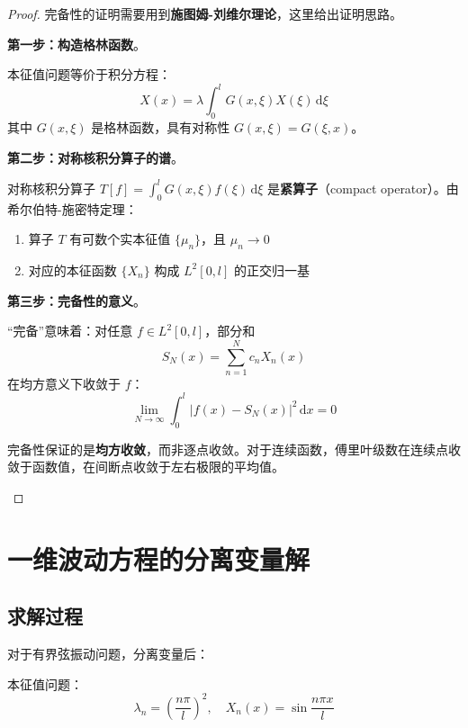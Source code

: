 \begin{proof}
完备性的证明需要用到\textbf{施图姆-刘维尔理论}，这里给出证明思路。

\textbf{第一步：构造格林函数}。

本征值问题等价于积分方程：
\begin{equation}
    X(x) = \lambda\int_0^l G(x, \xi)X(\xi)\,\mathrm{d}\xi
\end{equation}
其中 $G(x, \xi)$ 是格林函数，具有对称性 $G(x, \xi) = G(\xi, x)$。

\textbf{第二步：对称核积分算子的谱}。

对称核积分算子 $T[f] = \int_0^l G(x, \xi)f(\xi)\,\mathrm{d}\xi$ 是\textbf{紧算子}（compact operator）。由希尔伯特-施密特定理：
\begin{enumerate}
    \item 算子 $T$ 有可数个实本征值 $\{\mu_n\}$，且 $\mu_n \to 0$
    \item 对应的本征函数 $\{X_n\}$ 构成 $L^2[0, l]$ 的正交归一基
\end{enumerate}

\textbf{第三步：完备性的意义}。

``完备''意味着：对任意 $f \in L^2[0, l]$，部分和
\begin{equation}
    S_N(x) = \sum_{n=1}^{N} c_n X_n(x)
\end{equation}
在均方意义下收敛于 $f$：
\begin{equation}
    \lim_{N \to \infty} \int_0^l |f(x) - S_N(x)|^2\,\mathrm{d}x = 0
\end{equation}

\begin{jinshi}
完备性保证的是\textbf{均方收敛}，而非逐点收敛。对于连续函数，傅里叶级数在连续点收敛于函数值，在间断点收敛于左右极限的平均值。
\end{jinshi}
\end{proof}

\section{一维波动方程的分离变量解}

\subsection{求解过程}

对于有界弦振动问题，分离变量后：

本征值问题：
\begin{equation}
    \lambda_n = \left(\frac{n\pi}{l}\right)^2, \quad X_n(x) = \sin\frac{n\pi x}{l}
\end{equation}

